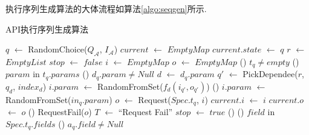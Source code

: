             执行序列生成算法的大体流程如算法\ref{algo:seqgen}所示.
            
            \begin{algorithm}
              	\scriptsize
              	
                \caption{API执行序列生成算法}
              	
                $q$ $\gets$ RandomChoice($Q_{\mathcal{A}}$, $I_{\mathcal{A}}$)\;
                $current$ $\gets$ $EmptyMap$\;
                $current.state$ $\gets$ $q$\;
                $r$ $\gets$ $EmptyList$\;
                $stop$ $\gets$ $false$\;
                 {
                	$i$ $\gets$ $EmptyMap$\;
                    $o$ $\gets$ $EmptyMap$\;
                	\If() {$t_q \neq empty$}{
                    	\ForEach() {$param$ in $t_q.params$} {
                        	\If() {$d_q.param \neq Null$} {
                            	$d$ $\gets$ $d_q.param$\;
                                $q'$ $\gets$ PickDependee($r$, $q_d$, $index_d$)\;
                                $i.param$ $\gets$ RandomFromSet($f_d(i_{q'}, o_{q'})$)\;
                            } \Else() {
                            	$i.param$ $\gets$ RandomFromSet($in_q.param$)\;
                            }
                        }
                        $o$ $\gets$ Request($Spec.t_q$, $i$)\;
                        $current.i$ $\gets$ $i$\;
                        $current.o$ $\gets$ $o$\;
                        \If() {RequestFail($o$)} {
                        	$T$ $\gets$ ``Request Fail''\;
                            $stop$ $\gets$ $true$\;
                        } \Else() {
                        	\ForEach() {$field$ in $Spec.t_q.fields$} {
                            	\If() {$a_q.field \neq Null$} {
}}}}}
\end{algorithm}
